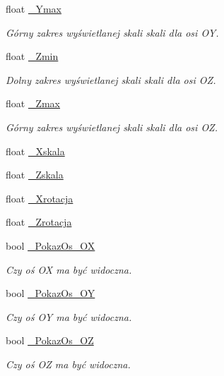 \begin{DoxyCompactItemize}
float \mbox{\hyperlink{class_pz_g_1_1_lacze_do_g_n_u_plota_ad7dfd3fad82ea0720ec89eacc18410bf}{\+\_\+\+Ymax}}
\begin{DoxyCompactList}\small\item\em Górny zakres wyświetlanej skali skali dla osi {\itshape OY}. \end{DoxyCompactList}\item 
float \mbox{\hyperlink{class_pz_g_1_1_lacze_do_g_n_u_plota_a8f9797e881df35f4206cb7d8030e5edc}{\+\_\+\+Zmin}}
\begin{DoxyCompactList}\small\item\em Dolny zakres wyświetlanej skali skali dla osi {\itshape OZ}. \end{DoxyCompactList}\item 
float \mbox{\hyperlink{class_pz_g_1_1_lacze_do_g_n_u_plota_a26949eedd421832f0f206ce3c8f90694}{\+\_\+\+Zmax}}
\begin{DoxyCompactList}\small\item\em Górny zakres wyświetlanej skali skali dla osi {\itshape OZ}. \end{DoxyCompactList}\item 
float \mbox{\hyperlink{class_pz_g_1_1_lacze_do_g_n_u_plota_a2c9303c4dbb4c9f0ddc4f1fe02eb3f70}{\+\_\+\+Xskala}}
\item 
float \mbox{\hyperlink{class_pz_g_1_1_lacze_do_g_n_u_plota_a85446d06b2d714b2f852ef43c47c73c1}{\+\_\+\+Zskala}}
\item 
float \mbox{\hyperlink{class_pz_g_1_1_lacze_do_g_n_u_plota_a21e77f0a2bfb7fed989b6dc2d64b5a7e}{\+\_\+\+Xrotacja}}
\item 
float \mbox{\hyperlink{class_pz_g_1_1_lacze_do_g_n_u_plota_aa65781b1ff96dfb31a780e98ee28d6ed}{\+\_\+\+Zrotacja}}
\item 
bool \mbox{\hyperlink{class_pz_g_1_1_lacze_do_g_n_u_plota_a833aa8994b9913786f920ec8c259731f}{\+\_\+\+Pokaz\+Os\+\_\+\+OX}}
\begin{DoxyCompactList}\small\item\em Czy oś OX ma być widoczna. \end{DoxyCompactList}\item 
bool \mbox{\hyperlink{class_pz_g_1_1_lacze_do_g_n_u_plota_ae8d9b4dac5eae6ce86b7043c45b70ed8}{\+\_\+\+Pokaz\+Os\+\_\+\+OY}}
\begin{DoxyCompactList}\small\item\em Czy oś OY ma być widoczna. \end{DoxyCompactList}\item 
bool \mbox{\hyperlink{class_pz_g_1_1_lacze_do_g_n_u_plota_a5b0afc06dc248790d2e7475b2162e309}{\+\_\+\+Pokaz\+Os\+\_\+\+OZ}}
\begin{DoxyCompactList}\small\item\em Czy oś OZ ma być widoczna. \end{DoxyCompactList}\end{DoxyCompactItemize}
